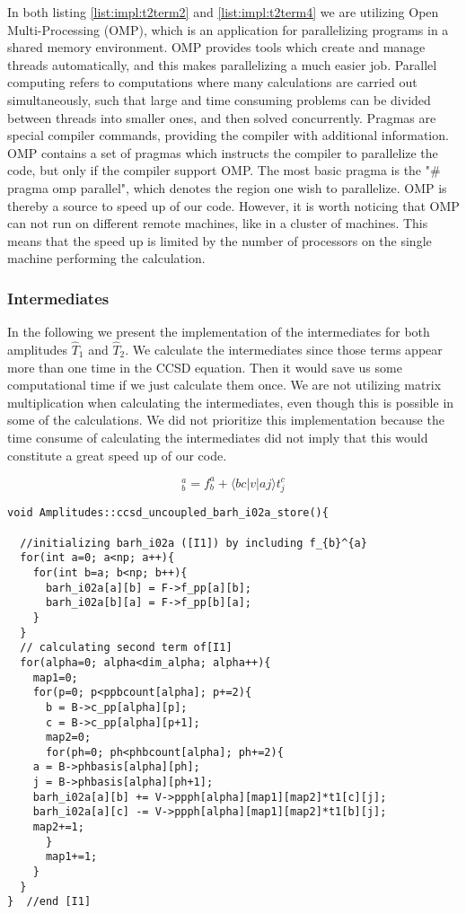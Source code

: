 In both listing \ref{list:impl:t2term2} and \ref{list:impl:t2term4} we are utilizing Open Multi-Processing (OMP), which is an application for parallelizing programs in a shared memory environment. OMP provides tools which create and manage threads automatically, and this makes parallelizing a much easier job. Parallel computing refers to computations where many calculations are carried out simultaneously, such that large and time consuming problems can be divided between threads into smaller ones, and then solved concurrently. Pragmas are special compiler commands, providing the compiler with additional information. OMP contains a set of pragmas which instructs the compiler to parallelize the code, but only if the compiler support OMP. The most basic pragma is the "$\#$pragma omp parallel", which denotes the region one wish to parallelize. OMP is thereby a source to speed up of our code. However, it is worth noticing that OMP can not run on different remote machines, like in a cluster of machines. This means that the speed up is limited by the number of processors on the single machine performing the calculation.  

\subsubsection{Intermediates}

In the following we present the implementation of the intermediates for both amplitudes $\hat{T}_1$ and $\hat{T}_2$. We calculate the intermediates since those terms appear more than one time in the CCSD equation. Then it would save us some computational time if we just calculate them once. We are not utilizing matrix multiplication when calculating the intermediates, even though this is possible in some of the calculations. We did not prioritize this implementation because the time consume of calculating the intermediates did not imply that this would constitute a great speed up of our code.

\begin{equation*}
[I1]_{b}^{a}=f_{b}^{a}+\langle bc|v|aj\rangle t_j^c
\end{equation*}
\begin{lstlisting}[label={list:impl:intermediate1},caption={implementation of I1 in the amp1 class function ccsd\_uncoupled\_barh\_i02a\_store}]
void Amplitudes::ccsd_uncoupled_barh_i02a_store(){
 
  //initializing barh_i02a ([I1]) by including f_{b}^{a}
  for(int a=0; a<np; a++){
    for(int b=a; b<np; b++){
      barh_i02a[a][b] = F->f_pp[a][b];
      barh_i02a[b][a] = F->f_pp[b][a];
    }
  } 
  // calculating second term of[I1]
  for(alpha=0; alpha<dim_alpha; alpha++){
    map1=0;
    for(p=0; p<ppbcount[alpha]; p+=2){
      b = B->c_pp[alpha][p];
      c = B->c_pp[alpha][p+1];
      map2=0;
      for(ph=0; ph<phbcount[alpha]; ph+=2){   
	a = B->phbasis[alpha][ph];
	j = B->phbasis[alpha][ph+1];
	barh_i02a[a][b] += V->ppph[alpha][map1][map2]*t1[c][j];
	barh_i02a[a][c] -= V->ppph[alpha][map1][map2]*t1[b][j];
	map2+=1;
      }
      map1+=1;
    }
  }
}  //end [I1]
\end{lstlisting}

